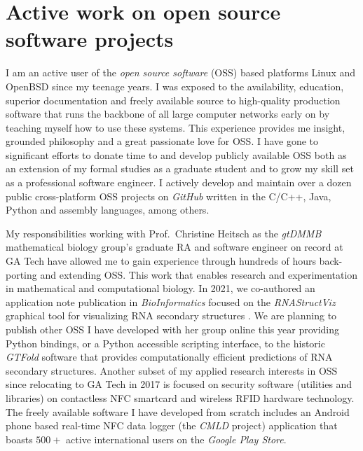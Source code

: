 \documentclass[10pt,reqno,letterpaper]{article}
\theoremstyle{plain}
\numberwithin{theorem}{section}
\theoremstyle{definition}
\begin{document}
\section{Active work on open source software projects}

I am an active user of the \emph{open source software} (OSS) based 
platforms Linux and OpenBSD since my 
teenage years. I was exposed to the availability, education, superior documentation and 
freely available source to high-quality production software that runs the backbone of all large 
computer networks early on by teaching myself how to use these systems. This experience provides me 
insight, grounded philosophy and a great passionate love for OSS. I have gone to significant efforts to 
donate time to and develop publicly available OSS both as an extension of my formal studies as 
a graduate student and to grow my skill set as a professional software engineer. 
I actively develop and maintain 
over a dozen public cross-platform OSS projects on \emph{GitHub} 
written in the C/C++, Java, Python and assembly languages, among others.

My responsibilities working with 
Prof.~Christine Heitsch as the \emph{gtDMMB} mathematical biology group's graduate RA and 
software engineer on record at GA Tech have allowed me to gain experience through 
hundreds of hours back-porting and extending OSS. This work that enables research and experimentation 
in mathematical and computational biology. 
In 2021, we co-authored an application note publication in \emph{BioInformatics} 
focused on the \emph{RNAStructViz} graphical tool for visualizing RNA secondary structures 
\cite{MDS-NO-21}. 
We are planning to publish other OSS I have developed with her group online this year providing 
Python bindings, or a Python accessible scripting interface, to the historic \emph{GTFold} software 
\cite{GTFOLD-PUB-REFERENCE} 
that provides computationally efficient predictions of RNA secondary structures. 
Another subset of my applied research interests in OSS since relocating to GA Tech in 2017 
is focused on security software (utilities and libraries) on contactless NFC smartcard and wireless RFID 
hardware technology. 
The freely available software I have developed from scratch includes an 
Android phone based real-time NFC data logger (the \emph{CMLD} project)
application that boasts $500+$ active international users on the 
\emph{Google Play Store}. 
\end{document}
